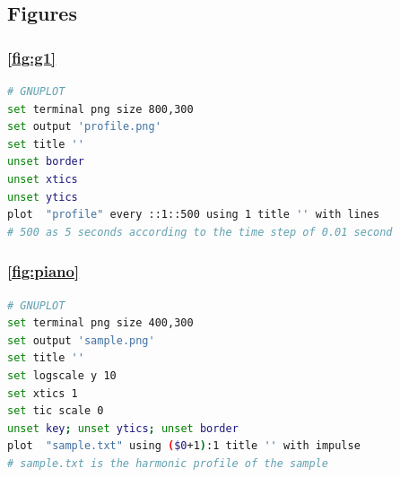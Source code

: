 \documentclass{book}
\begin{document}
\subsection{Figures}
\subsubsection{\ref{fig:g1}}
\label{an:pro}
\begin{lstlisting}[language=bash]
# GNUPLOT
set terminal png size 800,300 
set output 'profile.png' 
set title ''
unset border
unset xtics
unset ytics
plot  "profile" every ::1::500 using 1 title '' with lines 
# 500 as 5 seconds according to the time step of 0.01 second
\end{lstlisting}

\subsubsection{\ref{fig:piano}}
\label{an:pia}
\begin{lstlisting}[language=bash]
# GNUPLOT
set terminal png size 400,300 
set output 'sample.png' 
set title ''
set logscale y 10
set xtics 1
set tic scale 0
unset key; unset ytics; unset border 
plot  "sample.txt" using ($0+1):1 title '' with impulse
# sample.txt is the harmonic profile of the sample
\end{lstlisting}
\end{document}
